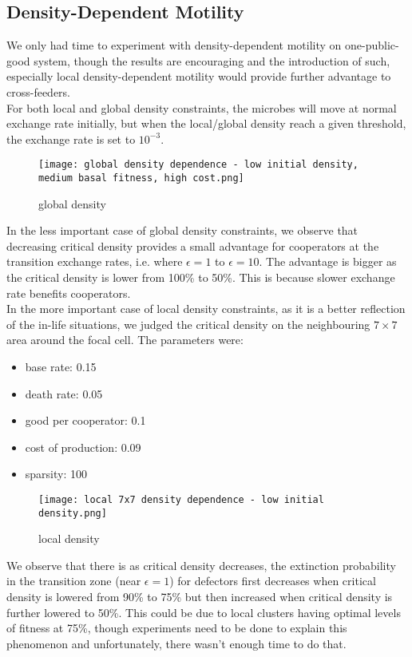 \documentclass[11pt]{article}
\begin{document}
\subsection{Density-Dependent Motility}
We only had time to experiment with density-dependent motility on one-public-good system, though the results are encouraging and the introduction of such, especially local density-dependent motility would provide further advantage to cross-feeders.\\
For both local and global density constraints, the microbes will move at normal exchange rate initially, but when the local/global density reach a given threshold, the exchange rate is set to $10^{-3}$.
\begin{figure}[H]
    \centering
    \texttt{[image: global density dependence - low initial density, medium basal fitness, high cost.png]}
    \caption{global density}
\end{figure}
\noindent In the less important case of global density constraints, we observe that decreasing critical density provides a small advantage for cooperators at the transition exchange rates, i.e. where $\epsilon=1$ to $\epsilon=10$. The advantage is bigger as the critical density is lower from 100\% to 50\%. This is because slower exchange rate benefits cooperators.\\
In the more important case of local density constraints, as it is a better reflection of the in-life situations, we judged the critical density on the neighbouring $7 \times 7$ area around the focal cell. The parameters were:
\begin{itemize}
    \item base rate: 0.15
    \item death rate: 0.05
    \item good per cooperator: 0.1
    \item cost of production: 0.09
    \item sparsity: 100
\end{itemize}
\begin{figure}[H]
    \centering
    \texttt{[image: local 7x7 density dependence - low initial density.png]}
    \caption{local density}
\end{figure}
We observe that there is as critical density decreases, the extinction probability in the transition zone (near $\epsilon=1$) for defectors first decreases when critical density is lowered from 90\% to 75\% but then increased when critical density is further lowered to 50\%. This could be due to local clusters having optimal levels of fitness at 75\%, though experiments need to be done to explain this phenomenon and unfortunately, there wasn't enough time to do that.\\\\
\end{document}
